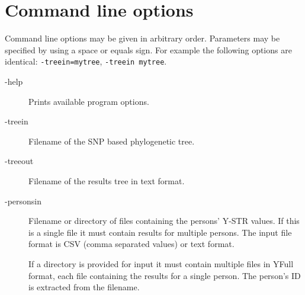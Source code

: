 \section{Command line options}

Command line options may be given in arbitrary order.
Parameters may be specified by using a space or equals sign.
For example the following options are identical:
\texttt{-treein=mytree}, \texttt{-treein mytree}.

\begin{description}
\item[-help] Prints available program options.

\item[-treein] Filename of the SNP based phylogenetic tree.
\item[-treeout] Filename of the results tree in text format.
\item[-personsin] Filename or directory of files containing the
	persons' Y-STR values. If this is a single file it must contain
	results for multiple persons. The input file format is CSV
    (comma separated values) or text format.

	If a directory is provided for input it must contain multiple
	files in YFull format, each file containing the results for
	a single person. The person's ID is extracted from the filename.


\end{description}
